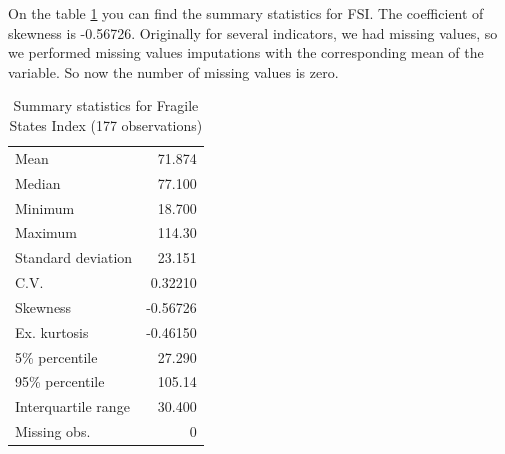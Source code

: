 \documentclass{article}
\begin{document}
On the table \ref{table:sum_fsi} you can find the summary statistics for FSI. The coefficient of skewness is -0.56726. Originally for several indicators, we had missing values, so we performed missing values imputations with the corresponding mean of the variable. So now the number of missing values is zero.\\

\begin{table}[h]
\begin{center}
\begin{tabular}{lr}
\toprule
Mean  &                         71.874\\
Median  &                       77.100\\
Minimum &                      18.700\\
Maximum &                      114.30\\
Standard deviation  &           23.151\\
C.V.  &                        0.32210\\
Skewness            &       -0.56726\\
Ex. kurtosis    &               -0.46150\\
5\% percentile &                27.290\\
95\% percentile  &               105.14\\
Interquartile range &          30.400\\
Missing obs.  &                      0\\
\bottomrule
\end{tabular}
\caption{Summary statistics for Fragile States Index (177 observations)}
\label{table:sum_fsi}
\end{center}
\end{table}
\end{document}
